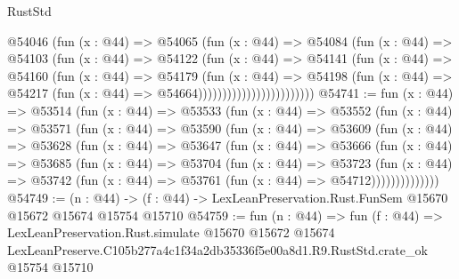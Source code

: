 \begin{lexlean}{RustStd}
\begin{coremodule}
                              @54046
                                (fun (x : @44) =>
                                @54065
                                  (fun (x : @44) =>
                                  @54084
                                    (fun (x : @44) =>
                                    @54103
                                      (fun (x : @44) =>
                                      @54122
                                        (fun (x : @44) =>
                                        @54141
                                          (fun (x : @44) =>
                                          @54160
                                            (fun (x : @44) =>
                                            @54179
                                              (fun (x : @44) =>
                                              @54198
                                                (fun (x : @44) =>
                                                @54217
                                                  (fun (x : @44) => @54664))))))))))))))))))))))))
@54741 := fun (x : @44) =>
  @53514
    (fun (x : @44) =>
    @53533
      (fun (x : @44) =>
      @53552
        (fun (x : @44) =>
        @53571
          (fun (x : @44) =>
          @53590
            (fun (x : @44) =>
            @53609
              (fun (x : @44) =>
              @53628
                (fun (x : @44) =>
                @53647
                  (fun (x : @44) =>
                  @53666
                    (fun (x : @44) =>
                    @53685
                      (fun (x : @44) =>
                      @53704
                        (fun (x : @44) =>
                        @53723
                          (fun (x : @44) =>
                          @53742 (fun (x : @44) => @53761 (fun (x : @44) => @54712))))))))))))))
@54749 := (n : @44) ->
  (f : @44) -> LexLeanPreservation.Rust.FunSem @15670 @15672 @15674 @15754 @15710
@54759 := fun (n : @44) =>
  fun (f : @44) =>
  LexLeanPreservation.Rust.simulate
    @15670
    @15672
    @15674
    LexLeanPreserve.C105b277a4c1f34a2db35336f5e00a8d1.R9.RustStd.crate_ok
    @15754
    @15710
\end{coremodule}
\end{lexlean}
